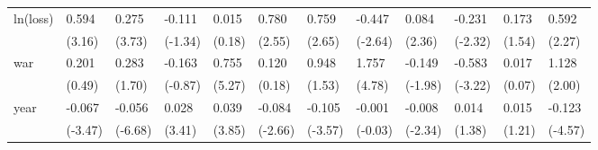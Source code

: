 \begin{tabular}{p{1.5cm} p{2cm} p{1.7cm} p{1.7cm} p{1.7cm} p{1.7cm} p{1.7cm} p{1.7cm} p{1.7cm} p{1.7cm} p{1.7cm} p{1.7cm}}
\hline
ln(loss)        &    0.594\sym{*}  &    0.275\sym{***}&   -0.111         &    0.015         &    0.780\sym{*}  &    0.759\sym{*}  &   -0.447\sym{*}  &    0.084\sym{*}  &   -0.231\sym{*}  &    0.173         &    0.592\sym{*}  \\
                &   (3.16)         &   (3.73)         &  (-1.34)         &   (0.18)         &   (2.55)         &   (2.65)         &  (-2.64)         &   (2.36)         &  (-2.32)         &   (1.54)         &   (2.27)         \\
war             &    0.201         &    0.283         &   -0.163         &    0.755\sym{***}&    0.120         &    0.948         &    1.757\sym{***}&   -0.149         &   -0.583\sym{**} &    0.017         &    1.128         \\
                &   (0.49)         &   (1.70)         &  (-0.87)         &   (5.27)         &   (0.18)         &   (1.53)         &   (4.78)         &  (-1.98)         &  (-3.22)         &   (0.07)         &   (2.00)         \\
year            &   -0.067\sym{**} &   -0.056\sym{***}&    0.028\sym{**} &    0.039\sym{**} &   -0.084\sym{*}  &   -0.105\sym{**} &   -0.001         &   -0.008\sym{*}  &    0.014         &    0.015         &   -0.123\sym{**} \\
                &  (-3.47)         &  (-6.68)         &   (3.41)         &   (3.85)         &  (-2.66)         &  (-3.57)         &  (-0.03)         &  (-2.34)         &   (1.38)         &   (1.21)         &  (-4.57)         \\
\end{tabular}
\def\sym#1{\ifmmode^{#1}\else\(^{#1}\)\fi}
